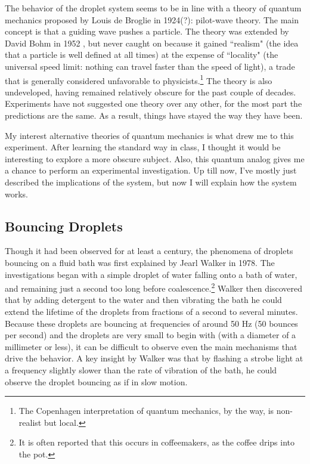     The behavior of the droplet system seems to be in line with a theory of quantum mechanics proposed by Louis de Broglie in 1924(?): pilot-wave theory. The main concept is that a guiding wave pushes a particle. The theory was extended by David Bohm in 1952 , but never caught on because it gained ``realism" (the idea that a particle is well defined at all times) at the expense of ``locality" (the universal speed limit: nothing can travel faster than the speed of light), a trade that is generally considered unfavorable to physicists.\footnote{The Copenhagen interpretation of quantum mechanics, by the way, is non-realist but local.} The theory is also undeveloped, having remained relatively obscure for the past couple of decades. Experiments have not suggested one theory over any other, for the most part the predictions are the same. As a result, things have stayed the way they have been. 
    
    My interest alternative theories of quantum mechanics is what drew me to this experiment. After learning the standard way in class, I thought it would be interesting to explore a more obscure subject. Also, this quantum analog gives me a chance to perform an experimental investigation. Up till now, I've mostly just described the implications of the system, but now I will explain how the system works. 

	    \subsection{Bouncing Droplets}
	    Though it had been observed for at least a century, the phenomena of droplets bouncing on a fluid bath was first explained by Jearl Walker in 1978. The investigations began with a simple droplet of water falling onto a bath of water, and remaining just a second too long before coalescence.\footnote{It is often reported that this occurs in coffeemakers, as the coffee drips into the pot.} Walker then discovered that by adding detergent to the water and then vibrating the bath he could extend the lifetime of the droplets from fractions of a second to several minutes. Because these droplets are bouncing at frequencies of around 50 Hz (50 bounces per second) and the droplets are very small to begin with (with a diameter of a millimeter or less), it can be difficult to observe even the main mechanisms that drive the behavior. A key insight by Walker was that by flashing a strobe light at a frequency slightly slower than the rate of vibration of the bath, he could observe the droplet bouncing as if in slow motion.
	    
